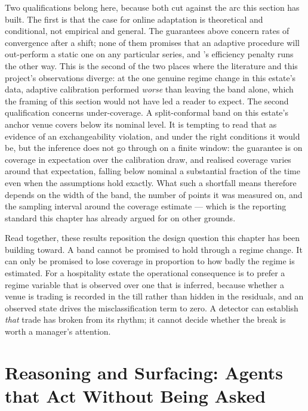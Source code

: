 Two qualifications belong here, because both cut against the arc this section
has built. The first is that the case for online adaptation is theoretical and
conditional, not empirical and general. The guarantees above concern rates of
convergence after a shift; none of them promises that an adaptive procedure
will out-perform a static one on any particular series, and
\citet{zaffran_adaptive_2022}'s efficiency penalty runs the other way. This is
the second of the two places where the literature and this project's
observations diverge: at the one genuine regime change in this estate's data,
adaptive calibration performed \emph{worse} than leaving the band alone, which
the framing of this section would not have led a reader to expect. The second
qualification concerns under-coverage. A split-conformal band on this estate's
anchor venue covers below its nominal level. It is tempting to read that as
evidence of an exchangeability violation, and under the right conditions it
would be, but the inference does not go through on a finite window: the
guarantee is on coverage in expectation over the calibration draw, and realised
coverage varies around that expectation, falling below nominal a substantial
fraction of the time even when the assumptions hold exactly. What such a
shortfall means therefore depends on the width of the band, the number of
points it was measured on, and the sampling interval around the coverage
estimate --- which is the reporting standard this chapter has already argued
for on other grounds.

Read together, these results reposition the design question this chapter has
been building toward. A band cannot be promised to hold through a regime
change. It can only be promised to lose coverage in proportion to how badly
the regime is estimated. For a hospitality estate the operational consequence
is to prefer a regime variable that is observed over one that is inferred,
because whether a venue is trading is recorded in the till rather than hidden
in the residuals, and an observed state drives the misclassification term to
zero. A detector can establish \emph{that} trade has broken from its rhythm;
it cannot decide whether the break is worth a manager's attention.

\section{Reasoning and Surfacing: Agents that Act Without Being Asked}
\label{sec:rw-surfacing}

